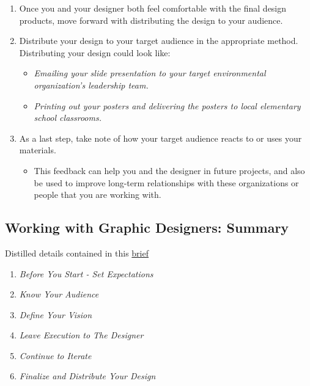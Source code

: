 \documentclass[
]{book}
\providecommand{\tightlist}{%
  \setlength{\itemsep}{0pt}\setlength{\parskip}{0pt}}
\begin{document}
\begin{enumerate}
\def\labelenumi{\arabic{enumi}.}
\tightlist
\item
  Once you and your designer both feel comfortable with the final design products, move forward with distributing the design to your audience.
\item
  Distribute your design to your target audience in the appropriate method. Distributing your design could look like:

  \begin{itemize}
  \tightlist
  \item
    \emph{Emailing your slide presentation to your target environmental organization's leadership team.}
  \item
    \emph{Printing out your posters and delivering the posters to local elementary school classrooms.}
  \end{itemize}
\item
  As a last step, take note of how your target audience reacts to or uses your materials.

  \begin{itemize}
  \tightlist
  \item
    This feedback can help you and the designer in future projects, and also be used to improve long-term relationships with these organizations or people that you are working with.
  \end{itemize}
\end{enumerate}

\hypertarget{working-with-graphic-designers-summary}{%
\subsection{Working with Graphic Designers: Summary}\label{working-with-graphic-designers-summary}}

Distilled details contained in this \href{files/M4S3_Working_With_Graphic_Designers_Brief.pdf}{brief}

\begin{enumerate}
\def\labelenumi{\arabic{enumi}.}
\tightlist
\item
  \emph{Before You Start - Set Expectations}
\item
  \emph{Know Your Audience}
\item
  \emph{Define Your Vision}
\item
  \emph{Leave Execution to The Designer}
\item
  \emph{Continue to Iterate}
\item
  \emph{Finalize and Distribute Your Design}
\end{enumerate}
\end{document}
